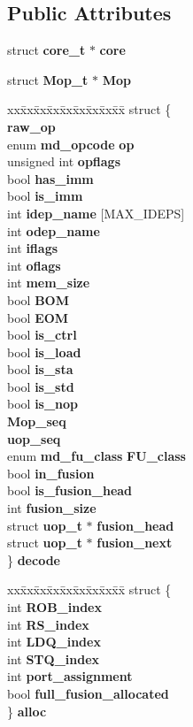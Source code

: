 \subsection*{Public Attributes}
\begin{CompactItemize}
\item 
struct {\bf core\_\-t} $\ast$ {\bf core}
\item 
struct {\bf Mop\_\-t} $\ast$ {\bf Mop}
\item 
\begin{tabbing}
xx\=xx\=xx\=xx\=xx\=xx\=xx\=xx\=xx\=\kill
struct \{\\
 {\bf raw\_op}\\
\>enum {\bf md\_opcode} {\bf op}\\
\>unsigned int {\bf opflags}\\
\>bool {\bf has\_imm}\\
\>bool {\bf is\_imm}\\
\>int {\bf idep\_name} [MAX\_IDEPS]\\
\>int {\bf odep\_name}\\
\>int {\bf iflags}\\
\>int {\bf oflags}\\
\>int {\bf mem\_size}\\
\>bool {\bf BOM}\\
\>bool {\bf EOM}\\
\>bool {\bf is\_ctrl}\\
\>bool {\bf is\_load}\\
\>bool {\bf is\_sta}\\
\>bool {\bf is\_std}\\
\>bool {\bf is\_nop}\\
 {\bf Mop\_seq}\\
 {\bf uop\_seq}\\
\>enum {\bf md\_fu\_class} {\bf FU\_class}\\
\>bool {\bf in\_fusion}\\
\>bool {\bf is\_fusion\_head}\\
\>int {\bf fusion\_size}\\
\>struct {\bf uop\_t} $\ast$ {\bf fusion\_head}\\
\>struct {\bf uop\_t} $\ast$ {\bf fusion\_next}\\
\} {\bf decode}\\

\end{tabbing}\item 
\begin{tabbing}
xx\=xx\=xx\=xx\=xx\=xx\=xx\=xx\=xx\=\kill
struct \{\\
\>int {\bf ROB\_index}\\
\>int {\bf RS\_index}\\
\>int {\bf LDQ\_index}\\
\>int {\bf STQ\_index}\\
\>int {\bf port\_assignment}\\
\>bool {\bf full\_fusion\_allocated}\\
\} {\bf alloc}\\


\end{tabbing}
\end{CompactItemize}
